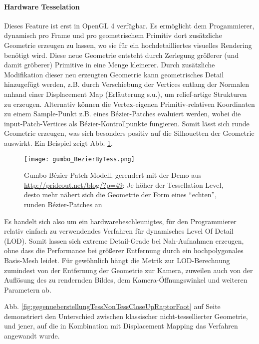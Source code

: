 	
	
	\paragraph{Hardware Tesselation}
	Dieses Feature ist erst in OpenGL 4 verfügbar. Es ermöglicht dem Progammierer, dynamisch pro Frame
	und pro geometrischem Primitiv dort zusätzliche Geometrie erzeugen zu lassen, wo sie für ein hochdetailliertes 
	visuelles Rendering benötigt wird. Diese neue Geometrie entsteht durch Zerlegung größerer (und damit gröberer)
	Primitive in eine Menge kleinerer. Durch zusätzliche Modifikation dieser neu erzeugten Geometrie kann
	geometrisches Detail hinzugefügt werden, z.B. durch Verschiebung der Vertices entlang der Normalen anhand einer
	Displacement Map (Erläuterung s.u.), um relief-artige Strukturen zu erzeugen. 
	Alternativ können die Vertex-eigenen Primitiv-relativen Koordinaten zu einem Sample-Punkt z.B. eines 
	Bézier-Patches evaluiert werden, wobei die input-Patch-Vertices als Bézier-Kontrollpunkte fungieren.
	Somit lässt sich runde Geometrie erzeugen, was sich besonders positiv auf die Silhouetten der Geometrie auswirkt.
	Ein Beispiel zeigt Abb. \ref{fig:bezierByTess}. \\
	
	\begin{figure}[!h]
		\texttt{[image: gumbo\_BezierByTess.png]}
		\caption{Gumbo Bézier-Patch-Modell,	gerendert mit der Demo aus
			\url{http://prideout.net/blog/?p=49}: Je höher der Tessellation Level, desto mehr nähert
			sich die Geometrie der Form eines "`echten"', runden Bézier-Patches an}
		\label{fig:bezierByTess}
	\end{figure}
	
	Es handelt sich also um ein hardwarebeschleunigtes, für den Programmierer relativ einfach zu verwendendes
	Verfahren für dynamisches Level Of Detail (LOD). Somit lassen sich extreme Detail-Grade bei Nah-Aufnahmen
	erzeugen, ohne dass die Performance bei größerer Entfernung durch ein hochpolygonales Basis-Mesh leidet. 
	Für gewöhnlich hängt die Metrik zur LOD-Berechnung zumindest von der Entfernung der Geometrie zur Kamera,
	zuweilen auch von der Auflösung des zu rendernden Bildes, dem Kamera-Öffnungswinkel und weiteren Parametern ab.
	
	Abb. \ref{fig:gegenueberstellungTessNonTessCloseUpRaptorFoot} auf Seite 
	\pageref{fig:gegenueberstellungTessNonTessCloseUpRaptorFoot} demonstriert den Unterschied zwischen klassischer
	nicht-tessellierter Geometrie, und jener, auf die in Kombination mit Displacement Mapping das 
	Verfahren angewandt wurde.
	
